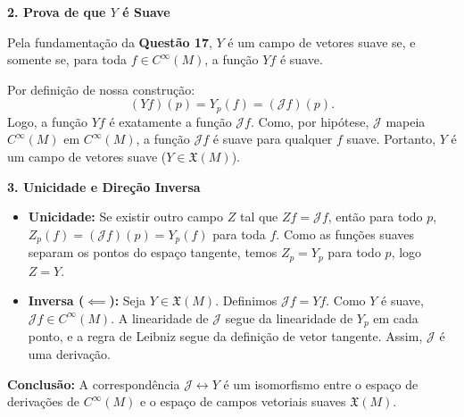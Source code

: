 {	\textbf{2. Prova de que $Y$ é Suave}
	
	Pela fundamentação da \textbf{Questão 17}, $Y$ é um campo de vetores suave se, e somente se, para toda $f \in C^\infty(M)$, a função $Yf$ é suave. 
	
	Por definição de nossa construção:
	\begin{equation*}
		(Yf)(p) = Y_p(f) = (\mathcal{J}f)(p).
	\end{equation*}
	Logo, a função $Yf$ é exatamente a função $\mathcal{J}f$. Como, por hipótese, $\mathcal{J}$ mapeia $C^\infty(M)$ em $C^\infty(M)$, a função $\mathcal{J}f$ é suave para qualquer $f$ suave. Portanto, $Y$ é um campo de vetores suave ($Y \in \mathfrak{X}(M)$).
	
	\textbf{3. Unicidade e Direção Inversa}
	
	\begin{itemize}
		\item \textbf{Unicidade:} Se existir outro campo $Z$ tal que $Zf = \mathcal{J}f$, então para todo $p$, $Z_p(f) = (\mathcal{J}f)(p) = Y_p(f)$ para toda $f$. Como as funções suaves separam os pontos do espaço tangente, temos $Z_p = Y_p$ para todo $p$, logo $Z = Y$.
		\item \textbf{Inversa ($\impliedby$):} Seja $Y \in \mathfrak{X}(M)$. Definimos $\mathcal{J}f = Yf$. Como $Y$ é suave, $\mathcal{J}f \in C^\infty(M)$. A linearidade de $\mathcal{J}$ segue da linearidade de $Y_p$ em cada ponto, e a regra de Leibniz segue da definição de vetor tangente. Assim, $\mathcal{J}$ é uma derivação.
	\end{itemize}
	
	\textbf{Conclusão:}
	A correspondência $\mathcal{J} \longleftrightarrow Y$ é um isomorfismo entre o espaço de derivações de $C^\infty(M)$ e o espaço de campos vetoriais suaves $\mathfrak{X}(M)$.
}
